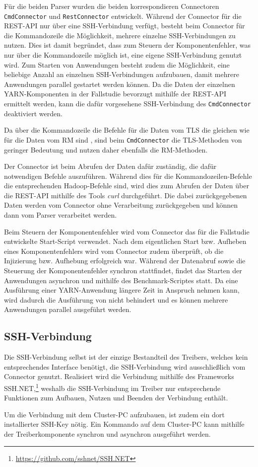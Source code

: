 Für die beiden Parser wurden die beiden korrespondieren Connectoren \texttt{CmdConnector} und \texttt{RestConnector} entwickelt. Während der Connector für die REST-API nur über eine SSH-Verbindung verfügt, besteht beim Connector für die Kommandozeile die Möglichkeit, mehrere einzelne SSH-Verbindungen zu nutzen. Dies ist damit begründet, dass zum Steuern der Komponentenfehler, was nur über die Kommandozeile möglich ist, eine eigene SSH-Verbindung genutzt wird. Zum Starten von Anwendungen besteht zudem die Möglichkeit, eine beliebige Anzahl an einzelnen SSH-Verbindungen aufzubauen, damit mehrere Anwendungen parallel gestartet werden können. Da die Daten der einzelnen YARN-Komponenten in der Fallstudie bevorzugt mithilfe der REST-API ermittelt werden, kann die dafür vorgesehene SSH-Verbindung des \texttt{CmdConnector} deaktiviert werden.

Da über die Kommandozeile die Befehle für die Daten vom \ac{TLS} die gleichen wie für die Daten vom \ac{RM} sind \cite{HadoopYarnTlServer271,HadoopYarnCmds271}, sind beim \texttt{CmdConnector} die \ac{TLS}-Methoden von geringer Bedeutung und nutzen daher ebenfalls die \ac{RM}-Methoden.

Der Connector ist beim Abrufen der Daten dafür zuständig, die dafür notwendigen Befehle auszuführen. Während dies für die Kommandozeilen-Befehle die entsprechenden Hadoop-Befehle sind, wird dies zum Abrufen der Daten über die REST-API mithilfe des Tools \emph{curl} durchgeführt. Die dabei zurückgegebenen Daten werden vom Connector ohne Verarbeitung zurückgegeben und können dann vom Parser verarbeitet werden.

Beim Steuern der Komponentenfehler wird vom Connector das für die Fallstudie entwickelte Start-Script verwendet. Nach dem eigentlichen Start bzw. Aufheben eines Komponentenfehlers wird vom Connector zudem überprüft, ob die Injizierung bzw. Aufhebung erfolgreich war. Während der Datenabruf sowie die Steuerung der Komponentenfehler synchron stattfindet, findet das Starten der Anwendungen asynchron und mithilfe des Benchmark-Scriptes statt. Da eine Ausführung einer YARN-Anwendung längere Zeit in Anspruch nehmen kann, wird dadurch die Ausführung von \sS nicht behindert und es können mehrere Anwendungen parallel ausgeführt werden.

\subsection{SSH-Verbindung}\label{sec:sshConnection}

Die SSH-Verbindung selbst ist der einzige Bestandteil des Treibers, welches kein entsprechendes Interface benötigt, die SSH-Verbindung wird ausschließlich vom Connector genutzt. Realisiert wird die Verbindung mithilfe des Frameworks SSH.NET,\footnote{\url{https://github.com/sshnet/SSH.NET}} weshalb die SSH-Verbindung im Treiber nur entsprechende Funktionen zum Aufbauen, Nutzen und Beenden der Verbindung enthält.

Um die Verbindung mit dem Cluster-PC aufzubauen, ist zudem ein dort installierter SSH-Key nötig. Ein Kommando auf dem Cluster-PC kann mithilfe der Treiberkomponente synchron und asynchron ausgeführt werden.